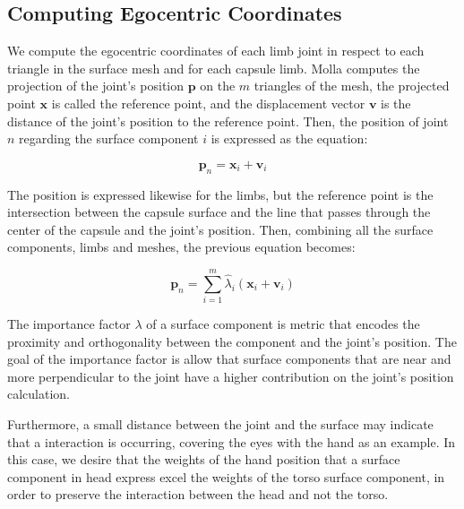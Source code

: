 \documentclass{vgtc}
\begin{document}
    \begin{figure}
        \begin{center}\end{center}
        \caption{}
        \label{}
    \end{figure}
    
    \hypertarget{computing-egocentric-coordinates}{%
\subsection{Computing Egocentric
Coordinates}\label{computing-egocentric-coordinates}}

We compute the egocentric coordinates of each limb joint in respect to
each triangle in the surface mesh and for each capsule limb. Molla
computes the projection of the joint's position \(\mathbf{p}\) on the
\(m\) triangles of the mesh, the projected point \(\mathbf{x}\) is
called the reference point, and the displacement vector \(\mathbf{v}\)
is the distance of the joint's position to the reference point. Then,
the position of joint \(n\) regarding the surface component \(i\) is
expressed as the equation:

\begin{equation}
\label{eq:egocoord_jointpos1}
\mathbf{p}_n = \mathbf{x}_i + \mathbf{v}_i
\end{equation}

The position is expressed likewise for the limbs, but the reference
point is the intersection between the capsule surface and the line that
passes through the center of the capsule and the joint's position. Then,
combining all the surface components, limbs and meshes, the previous
equation becomes:

\begin{equation}
\label{eq:egocoord_jointpos2}
\mathbf{p}_n = \sum_{i=1}^{m}\hat{\lambda}_{i}(\mathbf{x}_i + \mathbf{v}_i)
\end{equation}

The importance factor \(\lambda\) of a surface component is metric that
encodes the proximity and orthogonality between the component and the
joint's position. The goal of the importance factor is allow that
surface components that are near and more perpendicular to the joint
have a higher contribution on the joint's position calculation.

Furthermore, a small distance between the joint and the surface may
indicate that a interaction is occurring, covering the eyes with the
hand as an example. In this case, we desire that the weights of the hand
position that a surface component in head express excel the weights of
the torso surface component, in order to preserve the interaction
between the head and not the torso.
\end{document}
